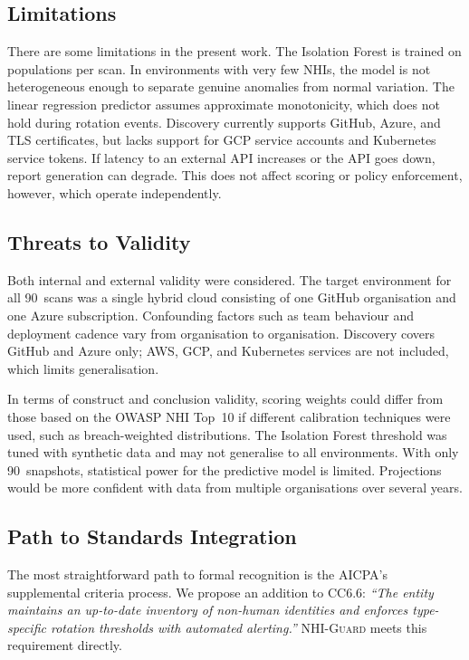 \documentclass[journal]{IEEEtran}
\begin{document}
\subsection{Limitations}

There are some limitations in the present work. The Isolation Forest is trained on populations per scan. In environments with very few NHIs, the model is not heterogeneous enough to separate genuine anomalies from normal variation. The linear regression predictor assumes approximate monotonicity, which does not hold during rotation events. Discovery currently supports GitHub, Azure, and TLS certificates, but lacks support for GCP service accounts and Kubernetes service tokens. If latency to an external API increases or the API goes down, report generation can degrade. This does not affect scoring or policy enforcement, however, which operate independently.

\subsection{Threats to Validity}

Both internal and external validity were considered. The target environment for all 90~scans was a single hybrid cloud consisting of one GitHub organisation and one Azure subscription. Confounding factors such as team behaviour and deployment cadence vary from organisation to organisation. Discovery covers GitHub and Azure only; AWS, GCP, and Kubernetes services are not included, which limits generalisation.

In terms of construct and conclusion validity, scoring weights could differ from those based on the OWASP NHI Top~10 if different calibration techniques were used, such as breach-weighted distributions. The Isolation Forest threshold was tuned with synthetic data and may not generalise to all environments. With only 90~snapshots, statistical power for the predictive model is limited. Projections would be more confident with data from multiple organisations over several years.

\subsection{Path to Standards Integration}

The most straightforward path to formal recognition is the AICPA's supplemental criteria process. We propose an addition to CC6.6: \emph{``The entity maintains an up-to-date inventory of non-human identities and enforces type-specific rotation thresholds with automated alerting.''} \textsc{NHI-Guard} meets this requirement directly.
\end{document}

